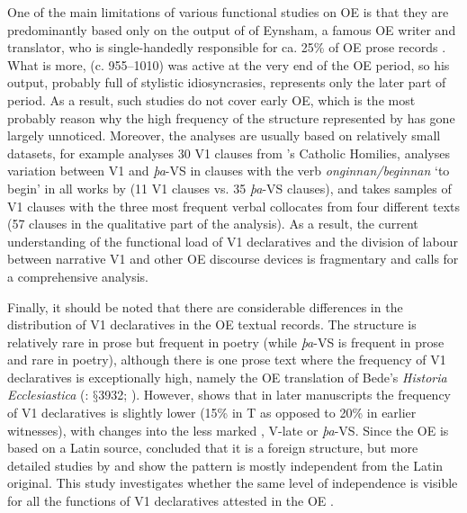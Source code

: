 \documentclass[output=paper,colorlinks,citecolor=brown]{langscibook}
\begin{document}
One of the main limitations of various functional studies on OE  is that they are predominantly based only on the output of  of Eynsham, a famous OE writer and translator, who is single-handedly responsible for ca. 25\% of OE prose records \citep{CichoszPęzik2021}. What is more,  (c. 955--1010) was active at the very end of the OE period, so his output, probably full of stylistic idiosyncrasies, represents only the later part of period. As a result, such studies do not cover early OE, which is the most probably reason why the high frequency of the structure represented by  has gone largely unnoticed. Moreover, the analyses are usually based on relatively small datasets, for example \citet{Ohkado2004} analyses 30 V1 clauses from 's Catholic Homilies, \citet{Los2000} analyses variation between V1 and \textit{þa}-VS in clauses with the verb \textit{onginnan/beginnan} ‘to begin' in all works by  (11 V1 clauses vs. 35 {\textit{þa}}-VS clauses), and \citet{Cichosz2022} takes samples of V1 clauses with the three most frequent verbal collocates from four different  texts (57 clauses in the qualitative part of the analysis). As a result, the current understanding of the functional load of V1 declaratives and the division of labour between narrative V1 and other OE discourse devices is fragmentary and calls for a comprehensive analysis.

Finally, it should be noted that there are considerable differences in the distribution of V1 declaratives in the OE textual records. The structure is relatively rare in prose but frequent in poetry (while \textit{þa}-VS is frequent in prose and rare in poetry), although there is one prose text where the frequency of V1 declaratives is exceptionally high, namely the OE translation of Bede's \textit{Historia Ecclesiastica} (\citealt{Mitchell1985}: $§$3932; \citealt{Calle-MartínMiranda-García2010}). However, \citet{Afros2022} shows that in later manuscripts the frequency of V1 declaratives is slightly lower (15\% in T as opposed to 20\% in earlier witnesses), with changes into the less marked , V-late or \textit{þa}-VS. Since the OE  is based on a Latin source, \citet{Ohkado2000} concluded that it is a foreign structure, but more detailed studies by \citet{Cichosz2017} and \citet{CichoszEtAl2016} show the pattern is mostly independent from the Latin original. This study investigates whether the same level of independence is visible for all the functions of V1 declaratives attested in the OE .
\end{document}
